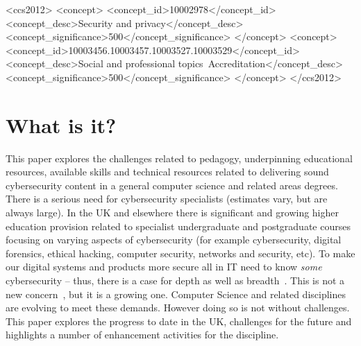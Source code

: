 \documentclass[sigconf]{acmart}
\begin{document}
\begin{CCSXML}
<ccs2012>
<concept>
<concept_id>10002978</concept_id>
<concept_desc>Security and privacy</concept_desc>
<concept_significance>500</concept_significance>
</concept>
<concept>
<concept_id>10003456.10003457.10003527.10003529</concept_id>
<concept_desc>Social and professional topics~Accreditation</concept_desc>
<concept_significance>500</concept_significance>
</concept>
</ccs2012>
\end{CCSXML}





\maketitle


\section {What is it?}

This paper explores the challenges related to pedagogy, underpinning educational resources, available skills and technical resources related to delivering sound cybersecurity content in a general computer science and related areas degrees. There is a serious need for cybersecurity specialists (estimates vary, but are always large). In the UK and elsewhere there is significant and growing higher education provision related to specialist undergraduate and postgraduate courses focusing on varying aspects of cybersecurity (for example cybersecurity, digital forensics, ethical hacking, computer security, networks and security, etc).    To make our digital systems and products more secure all in IT need to know \emph{some} cybersecurity -- thus, there is a case for depth as well as breadth~\cite{manson+pike:2014,davenport-et-al:latice2016}. This is not a new concern~\cite{Parr2014a}, but it is a growing one. Computer Science and related disciplines are evolving to meet these demands. However doing so is not without challenges. This paper explores the progress to date in the UK, challenges for the future and highlights a number of enhancement activities for the discipline.
\end{document}
